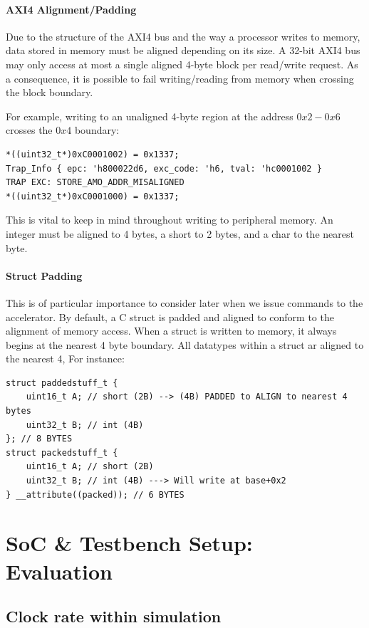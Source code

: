 \documentclass[a4paper,8pt]{report}
\begin{document}

\subsubsection{AXI4 Alignment/Padding}
Due to the structure of the AXI4 bus and the way a processor writes to memory,
data stored in memory must be aligned depending on its size.
A 32-bit AXI4 bus may only access at most a single aligned
4-byte block per read/write request. As a consequence, it is possible to fail
writing/reading from memory when crossing the block boundary.

For example, writing to an unaligned 4-byte region at the address $0x2-0x6$ crosses
the $0x4$ boundary:
\begin{verbatim}
*((uint32_t*)0xC0001002) = 0x1337;
Trap_Info { epc: 'h800022d6, exc_code: 'h6, tval: 'hc0001002 }
TRAP EXC: STORE_AMO_ADDR_MISALIGNED
*((uint32_t*)0xC0001000) = 0x1337;
\end{verbatim}

This is vital to keep in mind throughout writing to peripheral memory. An
integer must be aligned to 4 bytes, a short to 2 bytes, and a char to the
nearest byte. 

\subsubsection{Struct Padding}
This is of particular importance to consider later when we issue commands to the
accelerator. By default, a C struct is padded and aligned to conform to the
alignment of memory access. When a struct is written to memory, it always begins
at the nearest 4 byte boundary. All datatypes within a struct ar aligned to the
nearest 4, For instance:

\begin{verbatim}
struct paddedstuff_t {
    uint16_t A; // short (2B) --> (4B) PADDED to ALIGN to nearest 4 bytes
    uint32_t B; // int (4B)
}; // 8 BYTES
struct packedstuff_t {
    uint16_t A; // short (2B)
    uint32_t B; // int (4B) ---> Will write at base+0x2
} __attribute((packed)); // 6 BYTES
\end{verbatim}


\chapter{SoC \& Testbench Setup: Evaluation}
\section{Clock rate within simulation}
\end{document}
